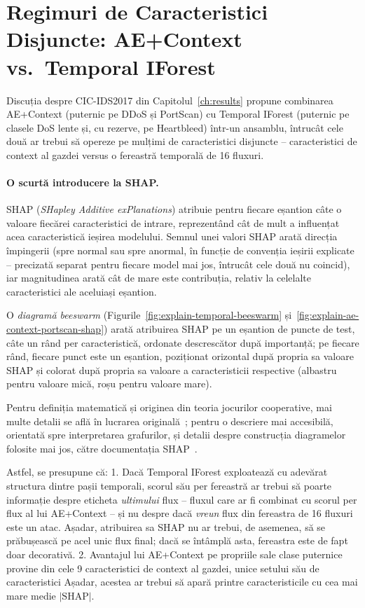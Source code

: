 \section{Regimuri de Caracteristici Disjuncte: AE+Context vs.\ Temporal IForest}
\label{sec:explain-disjoint-regime}

Discuția despre CIC-IDS2017 din Capitolul~\ref{ch:results} propune combinarea AE+Context (puternic pe DDoS și PortScan) cu Temporal IForest (puternic pe clasele DoS lente și, cu rezerve, pe Heartbleed) într-un ansamblu, întrucât cele două ar trebui să opereze pe mulțimi de caracteristici disjuncte
-- caracteristici de context al gazdei versus o fereastră temporală de 16 fluxuri.

\paragraph{O scurtă introducere la SHAP.} SHAP (\emph{SHapley Additive exPlanations}) atribuie pentru fiecare eșantion câte o valoare fiecărei caracteristici de intrare, reprezentând cât de mult a influențat acea caracteristică ieșirea modelului.
Semnul unei valori SHAP arată direcția împingerii (spre normal sau spre anormal, în funcție de convenția ieșirii explicate -- precizată separat pentru fiecare model mai jos, întrucât cele două nu coincid), iar magnitudinea arată cât de mare este contribuția, relativ la celelalte caracteristici ale aceluiași eșantion.

O \emph{diagramă beeswarm} (Figurile~\ref{fig:explain-temporal-beeswarm} și~\ref{fig:explain-ae-context-portscan-shap}) arată atribuirea SHAP pe un eșantion de puncte de test, câte un rând per caracteristică, ordonate descrescător după importanță; pe fiecare rând, fiecare punct este un eșantion, poziționat orizontal după propria sa valoare SHAP și colorat după propria sa valoare a caracteristicii respective (albastru pentru valoare mică, roșu pentru valoare mare).

Pentru definiția matematică și originea din teoria jocurilor cooperative, mai multe detalii se află în lucrarea originală~\parencite{lundberg2017unified}; pentru o descriere mai accesibilă, orientată spre interpretarea grafurilor, și detalii despre construcția diagramelor folosite mai jos, către documentația SHAP~\cite{shap_docs}.

Astfel, se presupune că:
1. Dacă Temporal IForest exploatează cu adevărat structura dintre pașii temporali, scorul său per fereastră ar trebui să poarte informație despre eticheta \emph{ultimului} flux -- fluxul care ar fi combinat cu scorul per flux al lui AE+Context -- și nu despre dacă \emph{vreun} flux din fereastra de 16 fluxuri este un atac.
Așadar, atribuirea sa SHAP nu ar trebui, de asemenea, să se prăbușească pe acel unic flux final; dacă se întâmplă asta, fereastra este de fapt doar decorativă.
2. Avantajul lui AE+Context pe propriile sale clase puternice provine din cele 9 caracteristici de context al gazdei, unice setului său de caracteristici
Așadar, acestea ar trebui să apară printre caracteristicile cu cea mai mare medie $|\text{SHAP}|$.

